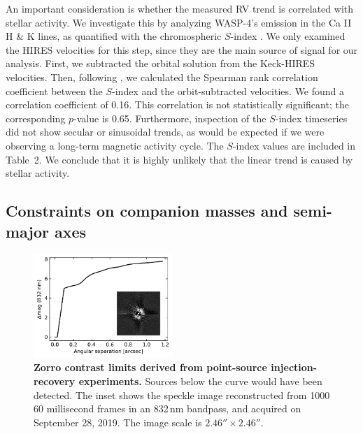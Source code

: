 \documentclass[12pt,twocolumn,tighten]{aastex62}
\begin{document}
An important consideration is whether the measured RV trend is
correlated with stellar activity.  We investigate this by analyzing
WASP-4's emission in the Ca II H \& K lines, as quantified with the
chromospheric $S$-index \citep{wright_chromospheric_2004}.  We only
examined the HIRES velocities for this step, since they are the main
source of signal for our analysis.  First, we subtracted the orbital
solution from the Keck-HIRES velocities.  Then, following
\citet{bryan_statistics_2016,bryan_excess_2019}, we calculated the
Spearman rank correlation coefficient between the $S$-index and the
orbit-subtracted velocities.  We found a correlation coefficient of
0.16. This correlation is not statistically significant; the
corresponding $p$-value is 0.65.  Furthermore, inspection of the
$S$-index timeseries did not show secular or sinusoidal trends, as
would be expected if we were observing a long-term magnetic activity
cycle.  The $S$-index values are included in Table~2.  We conclude
that it is highly unlikely that the linear trend is caused by stellar
activity.


\subsection{Constraints on companion masses and semi-major axes}

\begin{figure}[!t]
	\begin{center}
		\leavevmode
		\includegraphics[width=0.47\textwidth]{f3.pdf}
	\end{center}
	\vspace{-0.7cm}
    \caption{
      {\bf Zorro contrast limits derived from point-source
      injection-recovery experiments.} Sources below the curve would
      have been detected.  The inset shows the speckle image
      reconstructed from 1000 60 millisecond frames in an 832$\,$nm
      bandpass, and acquired on September 28, 2019.  The image scale
      is $2.46''\times2.46''$.
    }
    \label{fig:zorro}
\end{figure}
\end{document}
